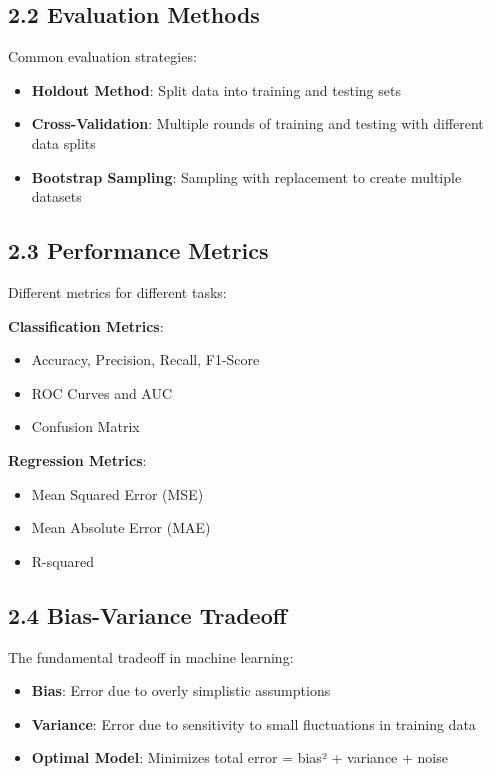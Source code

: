 \documentclass{amsart}
\theoremstyle{plain}
\theoremstyle{definition}
\theoremstyle{remark}
\begin{document}
\subsection{2.2 Evaluation Methods}

Common evaluation strategies:

\begin{itemize}
	\item \textbf{Holdout Method}: Split data into training and testing sets
	\item \textbf{Cross-Validation}: Multiple rounds of training and testing with different data splits
	\item \textbf{Bootstrap Sampling}: Sampling with replacement to create multiple datasets
\end{itemize}

\subsection{2.3 Performance Metrics}

Different metrics for different tasks:

\textbf{Classification Metrics}:

\begin{itemize}
	\item Accuracy, Precision, Recall, F1-Score
	\item ROC Curves and AUC
	\item Confusion Matrix
\end{itemize}

\textbf{Regression Metrics}:

\begin{itemize}
	\item Mean Squared Error (MSE)
	\item Mean Absolute Error (MAE)
	\item R-squared
\end{itemize}

\subsection{2.4 Bias-Variance Tradeoff}

The fundamental tradeoff in machine learning:

\begin{itemize}
	\item \textbf{Bias}: Error due to overly simplistic assumptions
	\item \textbf{Variance}: Error due to sensitivity to small fluctuations in training data
	\item \textbf{Optimal Model}: Minimizes total error = bias² + variance + noise
\end{itemize}
\end{document}

